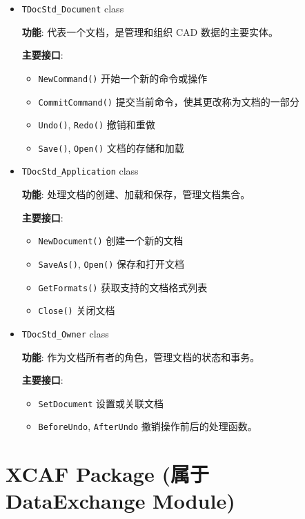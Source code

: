 \documentclass[11pt]{article}
\begin{document}
\begin{itemize}
\item \texttt{TDocStd\_Document} class

\textbf{功能}: 代表一个文档，是管理和组织 CAD 数据的主要实体。

\textbf{主要接口}:

\begin{itemize}
\item \texttt{NewCommand()} 开始一个新的命令或操作
\item \texttt{CommitCommand()} 提交当前命令，使其更改称为文档的一部分
\item \texttt{Undo()}, \texttt{Redo()} 撤销和重做
\item \texttt{Save()}, \texttt{Open()} 文档的存储和加载
\end{itemize}

\item \texttt{TDocStd\_Application} class

\textbf{功能}: 处理文档的创建、加载和保存，管理文档集合。

\textbf{主要接口}:

\begin{itemize}
\item \texttt{NewDocument()} 创建一个新的文档
\item \texttt{SaveAs()}, \texttt{Open()} 保存和打开文档
\item \texttt{GetFormats()} 获取支持的文档格式列表
\item \texttt{Close()} 关闭文档
\end{itemize}
\end{itemize}


\begin{itemize}
\item \texttt{TDocStd\_Owner} class

\textbf{功能}: 作为文档所有者的角色，管理文档的状态和事务。

\textbf{主要接口}:
\begin{itemize}
\item \texttt{SetDocument} 设置或关联文档
\item \texttt{BeforeUndo}, \texttt{AfterUndo} 撤销操作前后的处理函数。
\end{itemize}
\end{itemize}
\section{XCAF Package (属于 DataExchange Module)}
\label{sec:org52f4e14}
\end{document}
